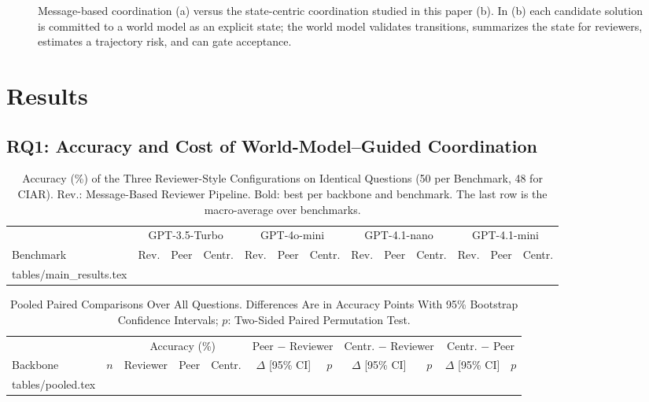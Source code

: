 \documentclass[lettersize,journal]{IEEEtran}
\makeatletter
\newcommand{\tabinput}[1]{\@@input #1 }
\makeatother
\begin{document}
\begin{figure}[!t]
    \centering
    \resizebox{\textwidth}{!}{}
    \caption{Message-based coordination (a) versus the state-centric coordination studied in this paper (b). In (b) each candidate solution is committed to a world model as an explicit state; the world model validates transitions, summarizes the state for reviewers, estimates a trajectory risk, and can gate acceptance.}
    \label{fig:concept}
\end{figure}





\section{Results}
\label{sec:results}

\subsection{RQ1: Accuracy and Cost of World-Model--Guided Coordination}
\label{sec:main_results}

\begin{table}[!t]
\caption{Accuracy (\%) of the Three Reviewer-Style Configurations on Identical Questions (50 per Benchmark, 48 for CIAR). Rev.: Message-Based Reviewer Pipeline. Bold: best per backbone and benchmark. The last row is the macro-average over benchmarks.}
\label{tab:main_results}
\centering
\small
\setlength{\tabcolsep}{3.5pt}
\begin{tabular}{l ccc ccc ccc ccc}
\toprule
 & \multicolumn{3}{c}{GPT-3.5-Turbo} & \multicolumn{3}{c}{GPT-4o-mini} & \multicolumn{3}{c}{GPT-4.1-nano} & \multicolumn{3}{c}{GPT-4.1-mini} \\
\cmidrule(lr){2-4}\cmidrule(lr){5-7}\cmidrule(lr){8-10}\cmidrule(lr){11-13}
Benchmark & Rev. & Peer & Centr. & Rev. & Peer & Centr. & Rev. & Peer & Centr. & Rev. & Peer & Centr. \\
\midrule
\tabinput{tables/main_results.tex}
\bottomrule
\end{tabular}
\end{table}

\begin{table}[!t]
\caption{Pooled Paired Comparisons Over All Questions. Differences Are in Accuracy Points With 95\% Bootstrap Confidence Intervals; $p$: Two-Sided Paired Permutation Test.}
\label{tab:pooled}
\centering
\small
\setlength{\tabcolsep}{4pt}
\begin{tabular}{l c ccc cc cc cc}
\toprule
 & & \multicolumn{3}{c}{Accuracy (\%)} & \multicolumn{2}{c}{Peer $-$ Reviewer} & \multicolumn{2}{c}{Centr. $-$ Reviewer} & \multicolumn{2}{c}{Centr. $-$ Peer} \\
\cmidrule(lr){3-5}\cmidrule(lr){6-7}\cmidrule(lr){8-9}\cmidrule(lr){10-11}
Backbone & $n$ & Reviewer & Peer & Centr. & $\Delta$ [95\% CI] & $p$ & $\Delta$ [95\% CI] & $p$ & $\Delta$ [95\% CI] & $p$ \\
\midrule
\tabinput{tables/pooled.tex}
\bottomrule
\end{tabular}
\end{table}
\end{document}
